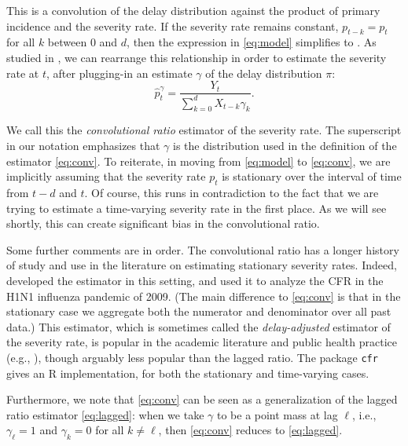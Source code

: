 \documentclass{article}
\renewcommand{\hat}{\widehat} %
\newcommand{\given}{\, \vert \,}
\begin{document}
This is a convolution of the delay distribution against the product of primary
incidence and the severity rate. If the severity rate remains constant, $p_{t-k}
= p_t$ for all $k$ between $0$ and $d$, then the expression in \eqref{eq:model}
simplifies to \smash{$\E[Y_t \given \{X_s\}_{s\leq t}] = p_t \sum_{k=0}^d
  X_{t-k} \pi_k$}. As studied in \citet{UKpaper}, we can rearrange this
relationship in order to estimate the severity rate at $t$, after plugging-in an
estimate $\gamma$ of the delay distribution $\pi$:   
\begin{equation}
\label{eq:conv}
\hat{p}_t^\gamma = \frac{Y_t}{\sum_{k=0}^d X_{t-k} \gamma_k}.
\end{equation}

We call this the \emph{convolutional ratio} estimator of the severity rate. The superscript in our notation \smash{$\hat{p}_t^\gamma$} emphasizes that
$\gamma$ is the distribution used in the definition of the estimator
\eqref{eq:conv}. To reiterate, in moving from \eqref{eq:model} to
\eqref{eq:conv}, we are implicitly assuming that the severity rate $p_t$ is
stationary over the interval of time from $t-d$ and $t$. Of course, this runs in
contradiction to the fact that we are trying to estimate a time-varying severity
rate in the first place. As we will see shortly, this can create significant
bias in the convolutional ratio.  

Some further comments are in order. The convolutional ratio has a longer history
of study and use in the literature on estimating stationary severity
rates. Indeed, \citet{nishiura} developed the estimator in this setting,  
and used it to analyze the CFR in the H1N1 influenza pandemic of 2009. (The main 
difference to \eqref{eq:conv} is that in the stationary case we aggregate both
the numerator and denominator over all past data.) This estimator, which is
sometimes called the \emph{delay-adjusted} estimator of the severity rate, is
popular in the academic literature and public health practice (e.g., 
\citealp{nishiuraEx1, nishiuraEx2, Russell2020, Unnikrishnan2021}), though   
arguably less popular than the lagged ratio. The package \texttt{cfr}
\citep{cfr_package} gives an R implementation, for both the stationary and
time-varying cases.  

Furthermore, we note that \eqref{eq:conv} can be seen as a generalization of the  
lagged ratio estimator \eqref{eq:lagged}: when we take $\gamma$ to be a point
mass at lag $\ell$, i.e., $\gamma_\ell = 1$ and $\gamma_k = 0$ for all $k \not=
\ell$, then \eqref{eq:conv} reduces to \eqref{eq:lagged}.   
\end{document}
